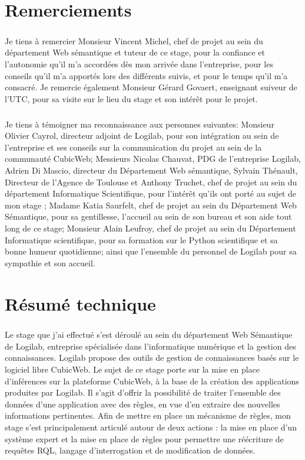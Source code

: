 \documentclass {report}
\begin{document}
\chapter*{Remerciements}

\paragraph{}
Je tiens à remercier Monsieur Vincent Michel, chef de projet au sein du département Web sémantique et tuteur de ce stage, pour la confiance et l'autonomie qu’il m’a accordées dès mon arrivée dans l’entreprise, pour les conseils qu'il m'a apportés lors des différents suivis, et pour le temps qu'il m'a consacré. Je remercie également Monsieur Gérard Govaert, enseignant suiveur de l'UTC, pour sa visite sur le lieu du stage et son intérêt pour le projet.
\paragraph{}
Je tiens à témoigner ma reconnaissance aux personnes suivantes: Monsieur Olivier Cayrol, directeur adjoint de Logilab, pour son intégration au sein de l'entreprise et ses conseils sur la communication du projet au sein de la communauté CubicWeb; Messieurs Nicolas Chauvat, PDG de l'entreprise Logilab, Adrien Di Mascio, directeur du Département Web sémantique, Sylvain Thénault, Directeur de l'Agence de Toulouse et Anthony Truchet, chef de projet au sein du département Informatique Scientifique,  pour l'intérêt qu'ils ont porté au sujet de mon stage ; Madame Katia Saurfelt, chef de projet au sein du Département Web Sémantique, pour sa gentillesse, l'accueil au sein de son bureau et son aide tout long de ce stage; Monsieur Alain Leufroy, chef de projet au sein du Département Informatique scientifique, pour sa formation sur le Python scientifique et sa bonne humeur quotidienne; ainsi que l'ensemble du personnel de Logilab pour sa sympathie et son accueil.



\chapter*{Résumé technique}
\paragraph{}
Le stage que j'ai effectué s'est déroulé au sein du département Web Sémantique de Logilab, entreprise spécialisée dans l’informatique numérique et la gestion des connaissances. Logilab propose des outils de gestion de connaissances basés sur le logiciel libre CubicWeb. Le sujet de ce stage porte sur la mise en place d'inférences sur la plateforme CubicWeb, à la base de la création des applications produites par Logilab. Il s'agit d'offrir la possibilité de traiter l'ensemble des données d'une application avec des règles, en vue d'en extraire des nouvelles informations pertinentes. Afin de mettre en place un mécanisme de règles, mon stage s'est principalement articulé autour de deux actions : la mise en place d'un système expert et la mise en place de règles pour permettre une réécriture de requêtes RQL, langage d'interrogation et de modification de données.
\end{document}
